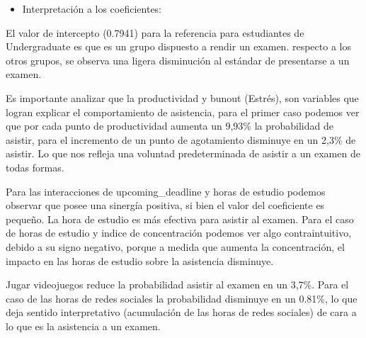 \documentclass[11pt]{article}
\providecommand{\tightlist}{%
      \setlength{\itemsep}{0pt}\setlength{\parskip}{0pt}}
\begin{document}
\begin{itemize}
\tightlist
\item
  Interpretación a los coeficientes:
\end{itemize}

El valor de intercepto (0.7941) para la referencia para estudiantes de
Undergraduate es que es un grupo dispuesto a rendir un examen. respecto
a los otros grupos, se observa una ligera disminución al estándar de
presentarse a un examen.

Es importante analizar que la productividad y bunout (Estrés), son
variables que logran explicar el comportamiento de asistencia, para el
primer caso podemos ver que por cada punto de productividad aumenta un
9,93\% la probabilidad de asistir, para el incremento de un punto de
agotamiento disminuye en un 2,3\% de asistir. Lo que nos refleja una
voluntad predeterminada de asistir a un examen de todas formas.

Para las interacciones de upcoming\_deadline y horas de estudio podemos
observar que posee una sinergía positiva, si bien el valor del
coeficiente es pequeño. La hora de estudio es más efectiva para asistir
al examen. Para el caso de horas de estudio y indice de concentración
podemos ver algo contraintuitivo, debido a su signo negativo, porque a
medida que aumenta la concentración, el impacto en las horas de estudio
sobre la asistencia disminuye.

Jugar videojuegos reduce la probabilidad asistir al examen en un 3,7\%.
Para el caso de las horas de redes sociales la probabilidad disminuye en
un 0.81\%, lo que deja sentido interpretativo (acumulación de las horas
de redes sociales) de cara a lo que es la asistencia a un examen.
\end{document}
